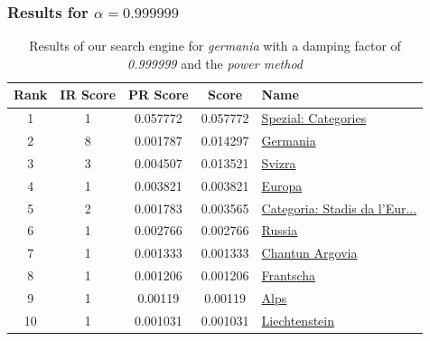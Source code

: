 \documentclass[10pt]{beamer}
\begin{document}
\begin{frame}
  \frametitle{Results for $\alpha = 0.999999$}
  \begin{table}
    \begin{tabular}{ | c | c | c | c | l | }
      \hline
      Rank & IR Score & PR Score &  Score & Name \\ \hline
      1 & 1 & 0.057772 & 0.057772 & \href{http://rm.wikipedia.org/wiki/Spezial:Categories}{Spezial: Categories} \\ \hline
      2 & 8 & 0.001787 & 0.014297 & \href{http://rm.wikipedia.org/wiki/Germania}{Germania} \\ \hline
      3 & 3 & 0.004507 & 0.013521 & \href{http://rm.wikipedia.org/wiki/Svizra}{Svizra} \\ \hline
      4 & 1 & 0.003821 & 0.003821 & \href{http://rm.wikipedia.org/wiki/Europa}{Europa} \\ \hline
      5 & 2 & 0.001783 & 0.003565 & \href{http://rm.wikipedia.org/wiki/Categoria:Stadis_da_l'Europa_dfba}{Categoria: Stadis da l'Eur...} \\ \hline
      6 & 1 & 0.002766 & 0.002766 & \href{http://rm.wikipedia.org/wiki/Russia}{Russia} \\ \hline
      7 & 1 & 0.001333 & 0.001333 & \href{http://rm.wikipedia.org/wiki/Chantun_Argovia}{Chantun Argovia} \\ \hline
      8 & 1 & 0.001206 & 0.001206 & \href{http://rm.wikipedia.org/wiki/Frantscha}{Frantscha} \\ \hline
      9 & 1 & 0.00119 & 0.00119 & \href{http://rm.wikipedia.org/wiki/Alps}{Alps} \\ \hline
      10 & 1 & 0.001031 & 0.001031 & \href{http://rm.wikipedia.org/wiki/Liechtenstein}{Liechtenstein} \\ \hline
    \end{tabular}
    \caption{Results of our search engine for \emph{germania} with a damping factor of \emph{0.999999} and the \emph{power method}}
    \label{table_d=0.999999}
  \end{table}
\end{frame}
\end{document}
